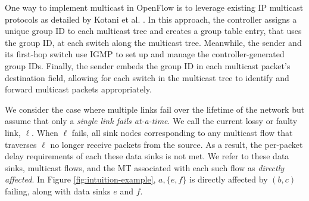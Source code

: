 One way to implement multicast in OpenFlow is to leverage existing IP multicast protocols as detailed by Kotani et al. \cite{Kotani12}.  
In this approach, the controller assigns a unique group ID to each multicast tree and creates a group table entry, that uses the group ID, at each switch along the multicast tree.  
Meanwhile, the sender and its first-hop switch use IGMP to set up and manage the controller-generated group IDs. Finally, the sender embeds the group ID in each multicast packet's destination 
field, allowing for each switch in the multicast tree to identify and forward multicast packets appropriately. 


We consider the case where multiple links fail over the lifetime of the network but assume that only a \emph{single link fails at-a-time}.
We call the current lossy or faulty link, $\ell$.  When $\ell$ fails, all sink nodes corresponding to any multicast flow that traverses $\ell$ no longer receive packets from the source. 
As a result, the per-packet delay requirements of each these data sinks is not met. 
We refer to these data sinks, multicast flows, and the MT associated with each such flow %
as \emph{directly affected}.  In Figure \ref{fig:intuition-example}, $a,\{e,f\}$ is directly affected by $(b,c)$ failing, along with data sinks $e$ and $f$.



